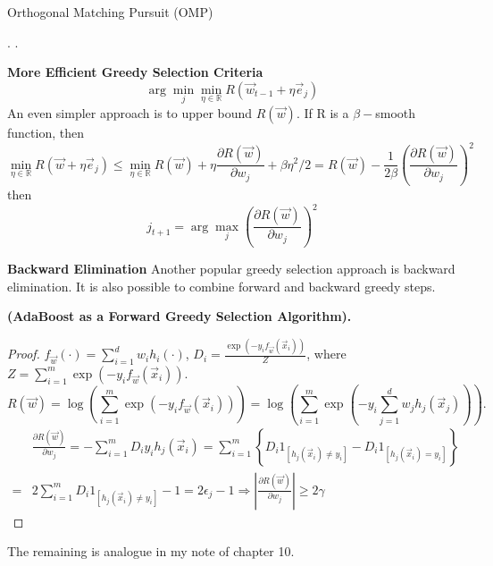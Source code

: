 \begin{example}
\begin{algorithm}[H]
    \caption{Orthogonal Matching Pursuit (OMP)}
    \begin{algorithmic}
        \EndFor.
        \EndFor.
    \end{algorithmic}
\end{algorithm}
\end{example}

\textbf{More Efficient Greedy Selection Criteria}
\[
    \arg\min_{j} \min_{\eta \in \mathbb{R}} R(\vec{w}_{t-1} + \eta \vec{e}_j)
\]
An even simpler approach is to upper bound $ R(\vec{w}) $. If R is a $ \beta- $smooth function, then
\[
    \min_{\eta \in \mathbb{R}} R(\vec{w} + \eta \vec{e}_j) 
    \le \min_{\eta \in \mathbb{R}}R(\vec{w}) + \eta \frac{\partial{R(\vec{w})}}{\partial{w_j}} + \beta \eta^2/2
    = R(\vec{w}) - \frac{1}{2\beta} {\left( \frac{\partial{R(\vec{w})}}{\partial{w_j}} \right)}^2
\]
then
\[
    j_{t+1} = \arg\max_{j}{\left( \frac{\partial{R(\vec{w})}}{\partial{w_j}} \right)}^2
\]

\textbf{Backward Elimination}
Another popular greedy selection approach is backward elimination. It is also possible to combine forward and backward greedy steps.

\begin{example}
    \textbf{(AdaBoost as a Forward Greedy Selection Algorithm).}
    \begin{proof}
        $ f_{\vec{w}}(\cdot) = \sum^{d}_{i=1} w_i h_i(\cdot) $, $ D_i = \frac{\exp(-y_i f_{\vec{w}}(\vec{x}_i))}{Z}  $, where $ Z = \sum^{m}_{i=1} \exp(-y_i f_{\vec{w}}(\vec{x}_i)) $.
        \[
            R(\vec{w}) = \log\left( \sum^{m}_{i=1} \exp\left( -y_i f_{\vec{w}}(\vec{x}_i) \right) \right) =  \log\left( \sum^{m}_{i=1} \exp\left( -y_i \sum^{d}_{j=1} w_j h_j(\vec{x}_j) \right) \right).
        \]
        \begin{align*}
            & \frac{\partial{R(\vec{w})}}{\partial{w_j}} = - \sum^{m}_{i=1} D_i y_i h_j(\vec{x}_i)
            = \sum^{m}_{i=1} \left\{ D_i 1_{\left[ h_j(\vec{x}_i) \ne y_i \right]} -D_i 1_{\left[ h_j(\vec{x}_i) = y_i \right]}\right\}\\
            =& 2 \sum^{m}_{i=1} D_i 1_{\left[ h_j(\vec{x}_i) \ne y_i \right]} - 1 = 2 \epsilon_j - 1
            \Rightarrow \left| \frac{\partial{R(\vec{w})}}{\partial{w_j}}  \right| \ge 2\gamma
        \end{align*}
    \end{proof}
\end{example}
The remaining is analogue in my note of chapter 10.

